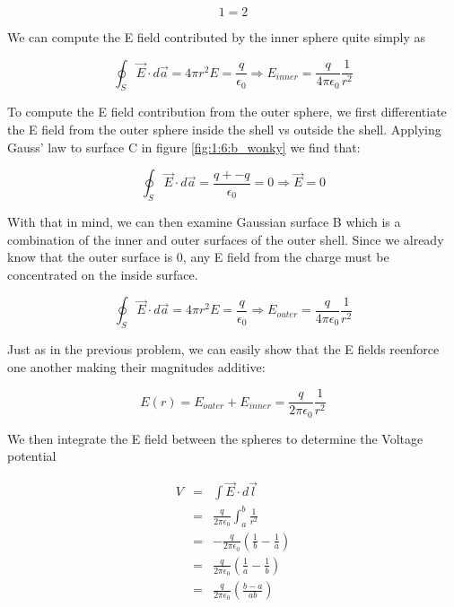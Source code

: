 \begin{equation}
1 = 2
\end{equation}

We can compute the E field contributed by the inner sphere quite
simply as

\begin{equation}
  \oint_S{\vec{E}\cdot d\vec{a}}
    = 4\pi r^2E
    = \frac{q}{\epsilon_0}
    \Rightarrow E_{inner} = \frac{q}{4\pi\epsilon_0}\frac{1}{r^2}
\end{equation}

To compute the E field contribution from the outer sphere, we first
differentiate the E field from the outer sphere inside the shell vs
outside the shell.  Applying Gauss' law to surface C in figure
\ref{fig:1:6:b_wonky} we find that:

\begin{equation}
  \oint_S{\vec{E}\cdot d\vec{a}} = \frac{q + -q}{\epsilon_0} = 0
    \Rightarrow \vec{E} = 0
\end{equation}

With that in mind, we can then examine Gaussian surface B which is a
combination of the inner and outer surfaces of the outer shell.  Since
we already know that the outer surface is 0, any E field from the
charge must be concentrated on the inside surface.

\begin{equation}
  \oint_S{\vec{E}\cdot d\vec{a}}
    = 4\pi r^2 E = \frac{q}{\epsilon_0}
    \Rightarrow E_{outer} = \frac{q}{4 \pi \epsilon_0} \frac{1}{r^2}
\end{equation}

Just as in the previous problem, we can easily show that the E fields
reenforce one another making their magnitudes additive:

\begin{equation}
  E(r) = E_{outer} + E_{inner}
  = \frac{q}{2 \pi \epsilon_0} \frac{1}{r^2}
\end{equation}

We then integrate the E field between the spheres to determine the
Voltage potential

\begin{equation}
  \begin{array}{lcl}
    V & = & \int \vec{E} \cdot d\vec{l}\\
    & = & \frac{q}{2 \pi \epsilon_0} \int_{a}^{b} \frac{1}{r^2}\\
    & = & - \frac{q}{2 \pi \epsilon_0} \left( \frac 1 b - \frac 1 a \right)\\
    & = & \frac{q}{2 \pi \epsilon_0} \left( \frac 1 a - \frac 1 b \right) \\ 
    & = & \frac{q}{2 \pi \epsilon_0} \left( \frac{b - a}{ab} \right) \\
  \end{array}
\end{equation}

